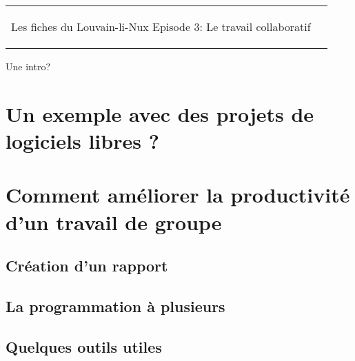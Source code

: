 



\begin{tabular}{p{13cm}r}
	\begin{center}{\Large Les fiches du Louvain-li-Nux\linebreak \linebreak
	\LARGE Episode 3: Le travail collaboratif}\end{center}
		&
	\usebox{\logollnux}
\end{tabular}


Une intro?

\section*{Un exemple avec des projets de logiciels libres ?}

\section*{Comment améliorer la productivité d'un travail de groupe}

\subsection*{Création d'un rapport}

\subsection*{La programmation à plusieurs}

\subsection*{Quelques outils utiles}
                                                                                                                   

